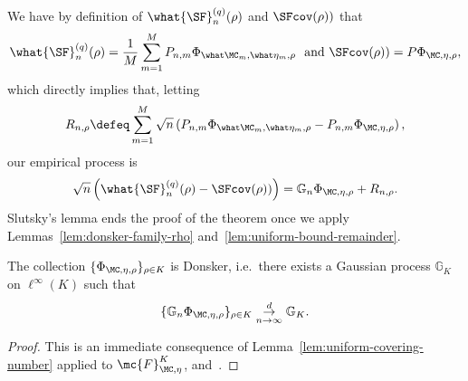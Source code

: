 We have by definition of $\what{\SF}^{(q)}_n(\rho)$ and $ \SFcov(\rho))$ that
\begin{align*}
\what{\SF}^{(q)}_n(\rho) = \frac{1}{M} \sum_{m=1}^M P_{n,m} \Phi_{\what \MC_m, \what \eta_m, \rho} ~ \text{ and } \SFcov(\rho))= P \Phi_{\MC, \eta, \rho},
\end{align*}
which directly implies that,  letting
\begin{align*}
R_{n, \rho} \defeq \sum_{m=1}^M \sqrt{n} \left( P_{n,m} \Phi_{\what \MC_m, \what \eta_m, \rho} - P_{n,m} \Phi_{\MC,  \eta, \rho} \right),
\end{align*}
our empirical process is
\begin{align*}
\sqrt{n} \left( \what{\SF}^{(q)}_n(\rho) - \SFcov(\rho)) \right) = \mathbb{G}_n \Phi_{\MC, \eta, \rho} + R_{n, \rho}.
\end{align*}
Slutsky's lemma ends the proof of the theorem once we apply Lemmas~\ref{lem:donsker-family-rho} and~\ref{lem:uniform-bound-remainder}.
\begin{lemma}
\label{lem:donsker-family-rho}
The collection $\{ \Phi_{\MC, \eta, \rho} \}_{\rho \in K}$ is Donsker, i.e.\, there exists a Gaussian process $\mathbb{G}_K$ on $\ell^\infty(K)$ such that
\begin{align*}
\{\mathbb{G}_n \Phi_{\MC, \eta, \rho} \}_{\rho \in K} \underset{n \to \infty}{\overset{d}{\to}} \mathbb{G}_K.
\end{align*}
\end{lemma}
\begin{proof}
This is an immediate consequence of Lemma~\ref{lem:uniform-covering-number} applied to $\mc{F}_{\MC, \eta}^K$,  and~\citet[Thm 19.14]{VanDerVaart98}.
\end{proof}

